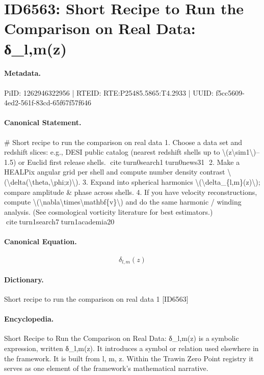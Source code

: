 \section*{ID6563: Short Recipe to Run the Comparison on Real Data: δ\_l,m(z)}
\paragraph{Metadata.}
PiID: 1262946322956 | RTEID: RTE:P25485.5865:T4.2933 | UUID: f5cc5609-4ed2-561f-83cd-65f67f57f646

\paragraph{Canonical Statement.}
\# Short recipe to run the comparison on real data 1. Choose a data set and redshift slices: e.g., DESI public catalog (nearest redshift shells up to \textbackslash{}(z\textbackslash{}sim1\textbackslash{})–1.5) or Euclid first release shells. citeturn0search1turn0news31 2. Make a HEALPix angular grid per shell and compute number density contrast \textbackslash{}(\textbackslash{}delta(\textbackslash{}theta,\textbackslash{}phi;z)\textbackslash{}). 3. Expand into spherical harmonics \textbackslash{}(\textbackslash{}delta\_\{l,m\}(z)\textbackslash{}); compare amplitude \& phase across shells. 4. If you have velocity reconstructions, compute \textbackslash{}(\textbackslash{}nabla\textbackslash{}times\textbackslash{}mathbf\{v\}\textbackslash{}) and do the same harmonic / winding analysis. (See cosmological vorticity literature for best estimators.) citeturn1search7turn1academia20

\paragraph{Canonical Equation.}
\[
\delta_{l,m}(z)
\]

\paragraph{Dictionary.}
Short recipe to run the comparison on real data 1 [ID6563]

\paragraph{Encyclopedia.}
Short Recipe to Run the Comparison on Real Data: δ\_l,m(z) is a symbolic expression, written δ\_l,m(z). It introduces a symbol or relation used elsewhere in the framework. It is built from l, m, z. Within the Trawin Zero Point registry it serves as one element of the framework's mathematical narrative.
